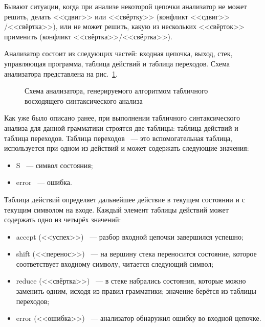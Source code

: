\documentclass[14pt]{matmex-diploma}
\begin{document}
Бывают ситуации, когда при анализе некоторой цепочки анализатор не может решить, делать <<сдвиг>> или <<свёртку>> (конфликт <<сдвиг>> /<<свёртка>>), или не может решить, какую из нескольких <<свёрток>> применить (конфликт <<свёртка>>/<<свёртка>>).

Анализатор состоит из следующих частей: входная цепочка, выход, стек, управляющая программа, таблица действий и таблица переходов. Схема анализатора представлена на рис.~\ref{analysator}.

\begin{figure}[h]
\caption{Схема анализатора, генерируемого алгоритмом табличного восходящего синтаксического анализа \cite{book:compilers_dotNET}}
\label{analysator}
\end{figure}

Как уже было описано ранее, при выполнении табличного синтаксического анализа для данной грамматики строятся две таблицы: таблица действий и таблица переходов. Таблица переходов ~--- это вспомогательная таблица, используется при одном из действий и может содержать следующие значения:
\begin{itemize}
\item
S ~--- символ состояния;
\item
error ~--- ошибка.
\end{itemize}

Таблица действий определяет дальнейшее действие в текущем состоянии и с текущим символом на входе. Каждый элемент таблицы действий может содержать одно из четырёх значений:
\begin{itemize}
\item
accept (<<успех>>) ~--- разбор входной цепочки завершился успешно;
\item
shift (<<перенос>>) ~--- на вершину стека переносится состояние, которое соответствует входному символу, читается следующий символ;
\item
reduce (<<свёртка>>) ~--- в стеке набрались состояния, которые можно заменить одним, исходя из правил грамматики; значение берётся из таблицы переходов;
\item
error (<<ошибка>>) ~--- анализатор обнаружил ошибку во входной цепочке.
\end{itemize}
\end{document}
